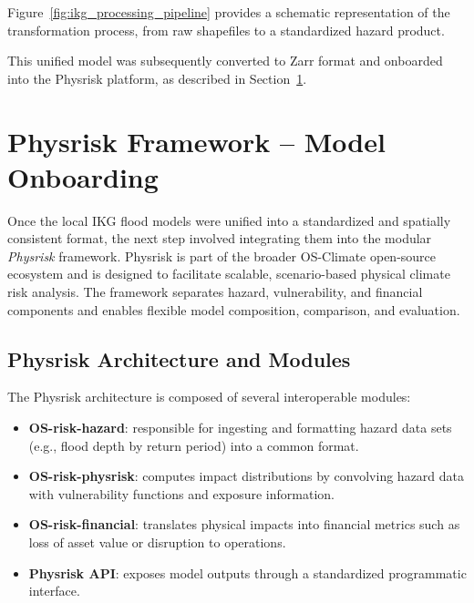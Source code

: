 Figure~\ref{fig:ikg_processing_pipeline} provides a schematic representation of the transformation process, from raw shapefiles to a standardized hazard product.

This unified model was subsequently converted to Zarr format and onboarded into the Physrisk platform, as described in Section~\ref{sec:physrisk-framework-model-onboarding}.


\section{Physrisk Framework – Model Onboarding}
\label{sec:physrisk-framework-model-onboarding}

Once the local IKG flood models were unified into a standardized and spatially consistent format, the next step involved integrating them into the modular \textit{Physrisk} framework. Physrisk is part of the broader OS-Climate open-source ecosystem and is designed to facilitate scalable, scenario-based physical climate risk analysis. The framework separates hazard, vulnerability, and financial components and enables flexible model composition, comparison, and evaluation.

\subsection{Physrisk Architecture and Modules}

The Physrisk architecture is composed of several interoperable modules:

\begin{itemize}
    \item \textbf{OS-risk-hazard}: responsible for ingesting and formatting hazard data sets (e.g., flood depth by return period) into a common format.
    \item \textbf{OS-risk-physrisk}: computes impact distributions by convolving hazard data with vulnerability functions and exposure information.
    \item \textbf{OS-risk-financial}: translates physical impacts into financial metrics such as loss of asset value or disruption to operations.
    \item \textbf{Physrisk API}: exposes model outputs through a standardized programmatic interface.
\end{itemize}


